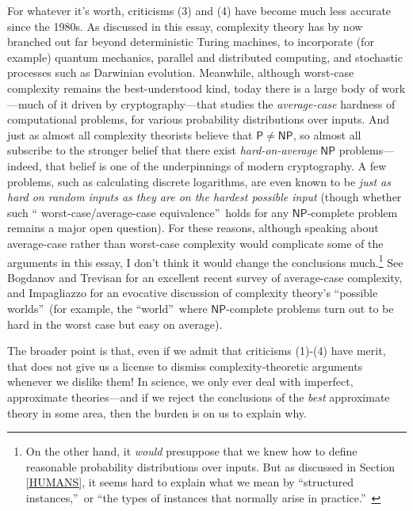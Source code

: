\documentclass[12pt,onecolumn]{article}%
\begin{document}
For whatever it's worth, criticisms (3) and (4) have become much less accurate
since the 1980s. As discussed in this essay, complexity theory has by now
branched out far beyond deterministic Turing machines, to incorporate (for
example) quantum mechanics, parallel and distributed computing, and stochastic
processes such as Darwinian evolution. Meanwhile, although worst-case
complexity remains the best-understood kind, today there is a large body of
work---much of it driven by cryptography---that studies the
\textit{average-case} hardness of computational problems, for various
probability distributions over inputs. And just as almost all complexity
theorists believe that $\mathsf{P}\neq\mathsf{NP}$, so almost all subscribe to
the stronger belief that there exist \textit{hard-on-average} $\mathsf{NP}$
problems---indeed, that belief is one of the underpinnings of modern
cryptography. A few problems, such as calculating discrete logarithms, are
even known to be \textit{just as hard on random inputs as they are on the
hardest possible input} (though whether such \textquotedblleft
worst-case/average-case equivalence\textquotedblright\  holds for any
$\mathsf{NP}$-complete problem remains a major open question). For these
reasons, although speaking about average-case rather than worst-case
complexity would complicate some of the arguments in this essay, I don't think
it would change the conclusions much.\footnote{On the other hand, it
\textit{would} presuppose that we knew how to define reasonable probability
distributions over inputs. But as discussed in Section \ref{HUMANS}, it
seems hard to explain what we mean by \textquotedblleft structured
instances,\textquotedblright\  or \textquotedblleft the types of instances that
normally arise in practice.\textquotedblright\ } See Bogdanov and Trevisan
\cite{bt} for an excellent recent survey of average-case complexity, and
Impagliazzo \cite{impagliazzo} for an evocative discussion of complexity
theory's \textquotedblleft possible worlds\textquotedblright\  (for example,
the \textquotedblleft world\textquotedblright\  where $\mathsf{NP}$-complete
problems turn out to be hard in the worst case but easy on average).

The broader point is that, even if we admit that criticisms (1)-(4) have
merit, that does not give us a license to dismiss complexity-theoretic
arguments whenever we dislike them! In science, we only ever deal with
imperfect, approximate theories---and if we reject the conclusions of the
\textit{best} approximate theory in some area, then the burden is on us to
explain why.
\end{document}
